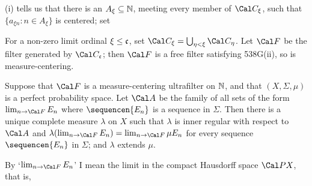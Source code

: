 {

\noindent (i) tells us that there is an $A_{\xi}\subseteq\Bbb N$, meeting
every member of $\Cal C_{\xi}$, such
that $\{a_{\xi n}:n\in A_{\xi}\}$ is centered;  set


\noindent For a non-zero limit ordinal $\xi\le\frak c$, set
$\Cal C_{\xi}=\bigcup_{\eta<\xi}\Cal C_{\eta}$.
Let $\Cal F$ be
the filter generated by $\Cal C_{\frak c}$;  then $\Cal F$ is a free filter
satisfying 538G(ii), so is measure-centering.
}%

 Suppose that $\Cal F$ is a measure-centering
ultrafilter on $\Bbb N$, and that $(X,\Sigma,\mu)$ is a perfect probability
space.   Let $\Cal A$ be the family of all sets of the form
$\lim_{n\to\Cal F}E_n$ where $\sequencen{E_n}$ is a sequence in $\Sigma$.
Then there is a unique complete measure $\lambda$ on $X$ such that
$\lambda$ is inner regular with respect to $\Cal A$ and
$\lambda(\lim_{n\to\Cal F}E_n)=\lim_{n\to\Cal F}\mu E_n$
for every sequence $\sequencen{E_n}$ in $\Sigma$;  and $\lambda$ extends
$\mu$.

\medskip

 By `$\lim_{n\to\Cal F}E_n$' I mean the limit in the
compact Hausdorff space $\Cal PX$, that is,


